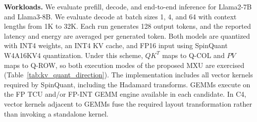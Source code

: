 \documentclass[sigconf,anonymous,nonacm]{acmart}
\newcommand{\fpint}{FP-INT}
\begin{document}

\textbf{Workloads.}
We evaluate prefill, decode, and end-to-end inference for Llama2-7B\cite{llama2} and Llama3-8B\cite{llama3}. We evaluate decode at batch sizes 1, 4, and 64 with context lengths from 1K to 32K. Each run generates 128 output tokens, and the reported latency and energy are averaged per generated token. Both models are quantized with INT4 weights, an INT4  KV cache, and FP16 input using SpinQuant W4A16KV4 quantization\cite{liu2024spinquant}. Under this scheme, $QK^T$ maps to Q-COL and $PV$ maps to Q-ROW, so both execution modes of the proposed MXU are exercised (Table~\ref{tab:kv_quant_direction}). The implementation includes all vector kernels required by SpinQuant, including the Hadamard transforms. GEMMs execute on the FP TCU and/or \fpint{} GEMM engine available in each candidate. In C4, vector kernels adjacent to GEMMs fuse the required layout transformation rather than invoking a standalone kernel.
\end{document}
